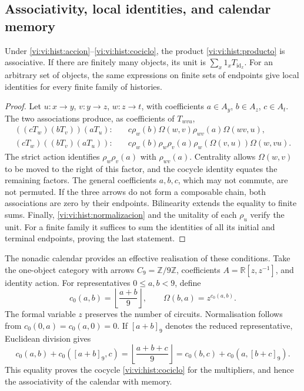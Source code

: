 \subsection{Associativity, local identities, and calendar memory}
\label{vi:vi:hist:asociatividad}

\begin{proposition}
Under \eqref{vi:vi:hist:accion}--\eqref{vi:vi:hist:cociclo}, the product
\eqref{vi:vi:hist:producto} is associative. If there are finitely many objects, its unit
is \(\sum_x1_xT_{\operatorname{id}_x}\). For an arbitrary set of
objects, the same expressions on finite sets of endpoints
give local identities for every finite family of histories.
\end{proposition}
\begin{proof}
Let \(u:x\to y\), \(v:y\to z\), \(w:z\to t\), with coefficients
\(a\in A_y\), \(b\in A_z\), \(c\in A_t\). The two associations
produce, as coefficients of \(T_{wvu}\),
\begin{align*}
 ((cT_w)(bT_v))(aT_u):\quad&
 c\rho_w(b)\Omega(w,v)\rho_{wv}(a)\Omega(wv,u),\\
 (cT_w)((bT_v)(aT_u)):\quad&
 c\rho_w(b)\rho_w\rho_v(a)
 \rho_w(\Omega(v,u))\Omega(w,vu).
\end{align*}
The strict action identifies \(\rho_w\rho_v(a)\) with
\(\rho_{wv}(a)\). Centrality allows
\(\Omega(w,v)\) to be moved to the right of this factor, and the cocycle identity
equates the remaining factors. The general coefficients
\(a,b,c\), which may not commute, are not permuted. If the three arrows do not form a
composable chain, both associations are zero by their endpoints.
Bilinearity extends the equality to finite sums. Finally,
\eqref{vi:vi:hist:normalizacion} and the unitality of each \(\rho_u\)
verify the unit. For a finite family it suffices to sum the identities
of all its initial and terminal endpoints, proving the last
statement.
\end{proof}

The nonadic calendar provides an effective realisation of these
conditions. Take the one-object category with arrows
\(C_9=\mathbb Z/9\mathbb Z\), coefficients
\(A=\mathbb R[z,z^{-1}]\), and identity action. For representatives
\(0\le a,b<9\), define
\begin{equation}
 c_0(a,b)=\left\lfloor\frac{a+b}{9}\right\rfloor,
 \qquad\Omega(b,a)=z^{c_0(a,b)}.
 \label{vi:vi:hist:carry-calendario}
\end{equation}
The formal variable \(z\) preserves the number of circuits. Normalisation
follows from \(c_0(0,a)=c_0(a,0)=0\). If \([a+b]_9\) denotes the
reduced representative, Euclidean division gives
\[
 c_0(a,b)+c_0([a+b]_9,c)
 =\left\lfloor\frac{a+b+c}{9}\right\rfloor
 =c_0(b,c)+c_0(a,[b+c]_9).
\]
This equality proves the cocycle \eqref{vi:vi:hist:cociclo} for the
multipliers, and hence the associativity of the calendar with memory.

